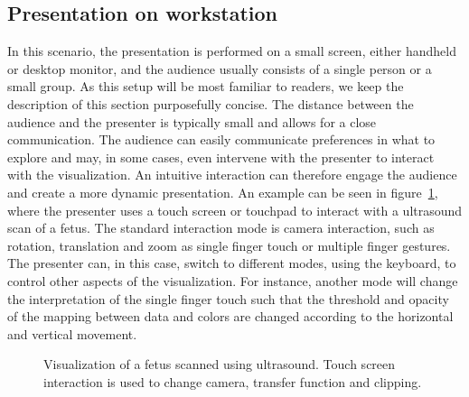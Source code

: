 \documentclass[review,journal]{vgtc}         %
\begin{document}
\subsection{Presentation on workstation} \label{sec:workstation}
In this scenario, the presentation is performed on a small screen, either handheld or desktop monitor, and the audience usually consists of a single person or a small group.
As this setup will be most familiar to readers, we keep the description of this section purposefully concise.
The distance between the audience and the presenter is typically small and allows for a close communication.
The audience can easily communicate preferences in what to explore and may, in some cases, even intervene with the presenter to interact with the visualization.
An intuitive interaction can therefore engage the audience and create a more dynamic presentation.
An example can be seen in figure~\ref{img:touch_workstation}, where the presenter uses a touch screen or touchpad to interact with a ultrasound scan of a fetus.
The standard interaction mode is camera interaction, such as rotation, translation and zoom as single finger touch or multiple finger gestures.
The presenter can, in this case, switch to different modes, using the keyboard, to control other aspects of the visualization.
For instance, another mode will change the interpretation of the single finger touch such that the threshold and opacity of the mapping between data and colors are changed according to the horizontal and vertical movement.

%
%
%
%

\begin{figure}
	\centering
	\caption{Visualization of a fetus scanned using ultrasound. Touch screen interaction is used to change camera, transfer function and clipping.}
	\label{img:touch_workstation}
\end{figure}
\end{document}
